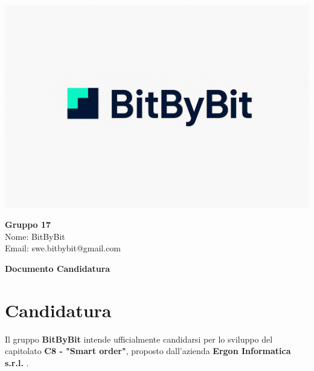 \documentclass[a4paper,12pt]{article}
\begin{document}
\begin{center}
    \begin{minipage}{0.25\textwidth}
        \centering
        \includegraphics[width=\linewidth]{logo.png}
    \end{minipage}
    \hfill
    \begin{minipage}{0.7\textwidth}
        \raggedright
        {\LARGE \textbf{Gruppo 17}}\\[0.3cm]
        {\large
        Nome: BitByBit\\
        Email: swe.bitbybit@gmail.com
        }
    \end{minipage}
\end{center}

\vspace{1.5cm}

\begin{center}
    {\LARGE \textbf{Documento Candidatura}}
\end{center}

\vspace*{\fill}

\clearpage

\clearpage
\tableofcontents
\thispagestyle{empty} %
\clearpage

\section{Candidatura}
Il gruppo \textbf{BitByBit} intende ufficialmente candidarsi per lo sviluppo del capitolato \textbf{C8 - "Smart order"}, proposto dall’azienda \textbf{Ergon Informatica s.r.l.} .
\end{document}
